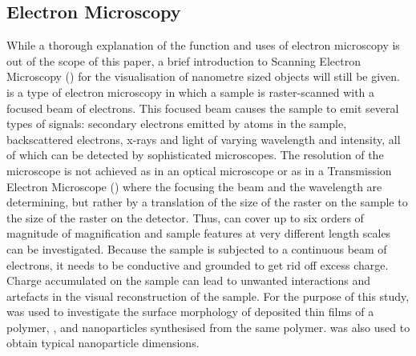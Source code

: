 \subsection{Electron Microscopy}
While a thorough explanation of the function and uses of electron microscopy is out of the scope of this paper, a brief introduction to Scanning Electron Microscopy (\sem{}) for the visualisation of nanometre sized objects will still be given. \sem{} is a type of electron microscopy in which a sample is raster-scanned with a focused beam of electrons. This focused beam causes the sample to emit several types of signals: secondary electrons emitted by atoms in the sample, backscattered electrons, x-rays and light of varying wavelength and intensity, all of which can be detected by sophisticated microscopes. The resolution of the microscope is not achieved as in an optical microscope or as in a Transmission Electron Microscope (\tem{}) where the focusing the beam and the wavelength are determining, but rather by a translation of the size of the raster on the sample to the size of the raster on the detector. Thus, \sem{} can cover up to six orders of magnitude of magnification and sample features at very different length scales can be investigated. Because the sample is subjected to a continuous beam of electrons, it needs to be conductive and grounded to get rid off excess charge. Charge accumulated on the sample can lead to unwanted interactions and artefacts in the visual reconstruction of the sample. For the purpose of this study, \sem{} was used to investigate the surface morphology of deposited thin films of a polymer, \pvdf{}, and nanoparticles synthesised from the same polymer. \sem{} was also used to obtain typical nanoparticle dimensions.
